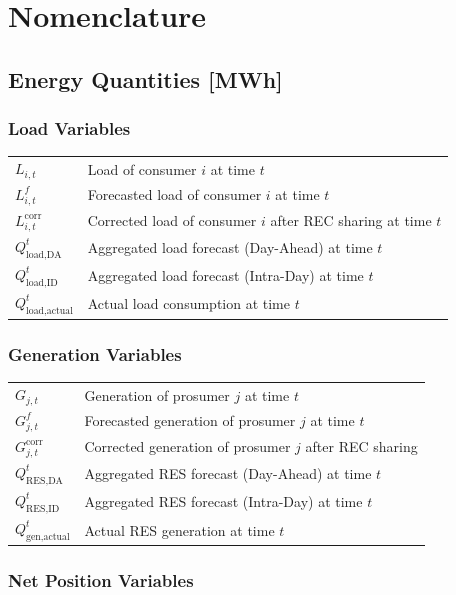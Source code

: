 \section{Nomenclature}

\subsection{Energy Quantities [MWh]}

\subsubsection{Load Variables}

\begin{tabular}{ll}
$L_{i,t}$ & Load of consumer $i$ at time $t$ \\
$L_{i,t}^f$ & Forecasted load of consumer $i$ at time $t$ \\
$L_{i,t}^{\text{corr}}$ & Corrected load of consumer $i$ after REC sharing at time $t$ \\
$Q_{\text{load,DA}}^{t}$ & Aggregated load forecast (Day-Ahead) at time $t$ \\
$Q_{\text{load,ID}}^{t}$ & Aggregated load forecast (Intra-Day) at time $t$ \\
$Q_{\text{load,actual}}^{t}$ & Actual load consumption at time $t$ \\
\end{tabular}

\subsubsection{Generation Variables}

\begin{tabular}{ll}
$G_{j,t}$ & Generation of prosumer $j$ at time $t$ \\
$G_{j,t}^f$ & Forecasted generation of prosumer $j$ at time $t$ \\
$G_{j,t}^{\text{corr}}$ & Corrected generation of prosumer $j$ after REC sharing \\
$Q_{\text{RES,DA}}^{t}$ & Aggregated RES forecast (Day-Ahead) at time $t$ \\
$Q_{\text{RES,ID}}^{t}$ & Aggregated RES forecast (Intra-Day) at time $t$ \\
$Q_{\text{gen,actual}}^{t}$ & Actual RES generation at time $t$ \\
\end{tabular}

\subsubsection{Net Position Variables}

